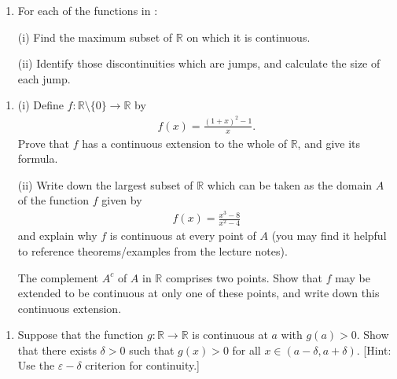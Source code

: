 \documentclass[letterpaper,10pt,english]{jupyterBook}
\begin{document}
\label{\detokenize{Problems:id17}}\begin{enumerate}
%
\setcounter{enumi}{16}
\item {} 
\sphinxAtStartPar
For each of the functions in {\hyperref[\detokenize{Problems:id8}]{}}:

\sphinxAtStartPar
(i) Find the maximum subset of \(\mathbb{R}\) on which it is continuous.

\sphinxAtStartPar
(ii) Identify those discontinuities which are jumps, and calculate the size of each jump.

\end{enumerate}
\label{\detokenize{Problems:id18}}\begin{enumerate}
%
\setcounter{enumi}{17}
\item {} 
\sphinxAtStartPar
(i) Define \(f:\mathbb{R} \setminus \{0\} \rightarrow \mathbb{R}\) by
\begin{equation*}
\begin{split}
    f(x) = \displaystyle\frac{(1 + x)^{2} - 1}{x}.
    \end{split}
\end{equation*}
\sphinxAtStartPar
Prove that \(f\) has a continuous extension to the whole of \(\mathbb{R}\), and give its formula.

\sphinxAtStartPar
(ii) Write down the largest subset of \(\mathbb{R}\) which can be taken as the domain \(A\) of the function \(f\) given by
\begin{equation*}
\begin{split}
    f(x) = \displaystyle\frac{x^{3}-8}{x^{2} - 4}
    \end{split}
\end{equation*}
\sphinxAtStartPar
and explain why \(f\) is continuous at every point of \(A\) (you may find it helpful to reference theorems/examples from the lecture notes).

\sphinxAtStartPar
The complement \(A^{c}\) of \(A\) in \(\mathbb{R}\) comprises two points. Show that \(f\) may be extended to be continuous at only one of these points, and write down this continuous extension.

\end{enumerate}
\label{\detokenize{Problems:id19}}\begin{enumerate}
%
\setcounter{enumi}{18}
\item {} 
\sphinxAtStartPar
{} Suppose that the function \(g: \mathbb{R} \rightarrow \mathbb{R}\) is continuous at \(a\) with \(g(a) > 0\). Show that there exists \(\delta > 0\) such that \(g(x) > 0\)  for all \( x \in (a - \delta, a + \delta)\). {[}Hint: Use the \(\varepsilon-\delta\) criterion for continuity.{]}

\end{enumerate}
\end{document}
